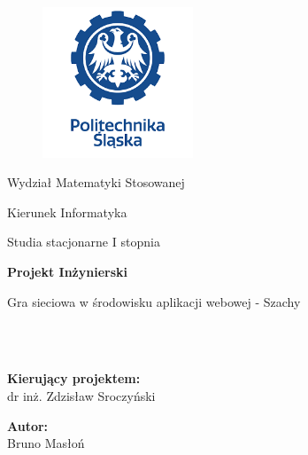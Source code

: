 \documentclass[12pt,a4paper]{article}
\begin{document}
\clearpage

\begin{figure}[h]
    \centering
    \includegraphics[width=0.4\textwidth]{images/ps-logo.png}
\end{figure}

\begin{center}
\large{Wydział Matematyki Stosowanej}
\end{center}
\begin{center}
\large{Kierunek Informatyka}
\end{center}
\begin{center}
\large{Studia stacjonarne I stopnia}
\end{center}

\hspace{6cm}

\begin{center}
\Huge\textbf{Projekt Inżynierski}
\end{center}
\begin{center}
\Large{Gra sieciowa w środowisku aplikacji webowej - Szachy}
\end{center}

\hspace{6cm}
\\\\

\begin{minipage}[t]{0.3\textwidth}
    \begin{center}
    \normalsize{\textbf{Kierujący projektem:}\\dr inż. Zdzisław Sroczyński}
    \end{center}
\end{minipage}
\hfill
\begin{minipage}[t]{0.3\textwidth}
    \begin{center}
    \normalsize{\textbf{Autor:}\\Bruno Masłoń}
    \end{center}
\end{minipage}
\end{document}
